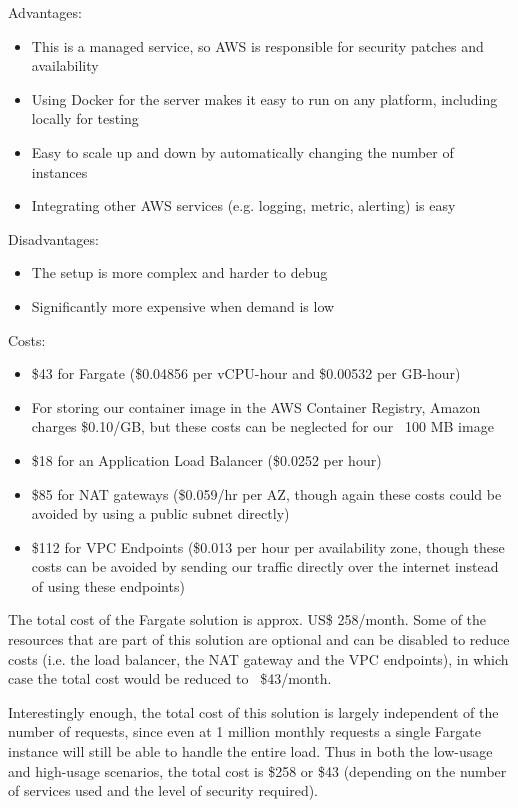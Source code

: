 
Advantages:
\begin{itemize}
\item This is a managed service, so AWS is responsible for security patches and availability
\item Using Docker for the server makes it easy to run on any platform, including locally for testing
\item Easy to scale up and down by automatically changing the number of instances
\item Integrating other AWS services (e.g. logging, metric, alerting) is easy
\end{itemize}

Disadvantages:
\begin{itemize}
\item The setup is more complex and harder to debug
\item Significantly more expensive when demand is low
\end{itemize}

Costs:
\begin{itemize}
\item \$43 for Fargate (\$0.04856 per vCPU-hour and \$0.00532 per GB-hour)
\item For storing our container image in the AWS Container Registry, Amazon charges \$0.10/GB, but these costs can be neglected for our ~100 MB image
\item \$18 for an Application Load Balancer (\$0.0252 per hour)
\item \$85 for NAT gateways (\$0.059/hr per AZ, though again these costs could be avoided by using a public subnet directly)
\item \$112 for VPC Endpoints (\$0.013 per hour per availability zone, though these costs can be avoided by sending our traffic directly over the internet instead of using these endpoints)
\end{itemize}

The total cost of the Fargate solution is approx. US\$ 258/month. Some of the resources that are part of this solution are optional and can be disabled to reduce costs (i.e. the load balancer, the NAT gateway and the VPC endpoints), in which case the total cost would be reduced to ~\$43/month.

Interestingly enough, the total cost of this solution is largely independent of the number of requests, since even at 1 million monthly requests a single Fargate instance will still be able to handle the entire load. Thus in both the low-usage and high-usage scenarios, the total cost is \$258 or \$43 (depending on the number of services used and the level of security required).

